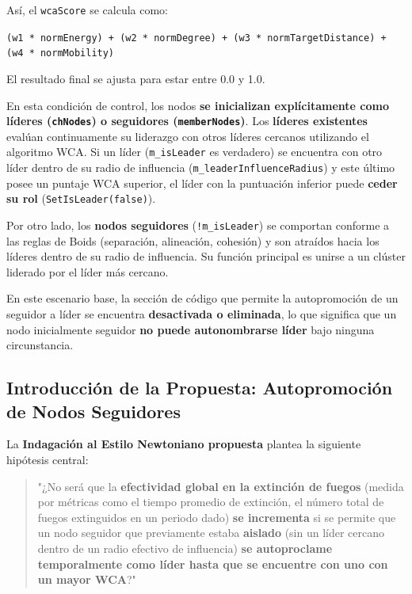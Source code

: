 \documentclass{article}
\begin{document}
Así, el \texttt{wcaScore} se calcula como:

\begin{center}
\texttt{(w1 * normEnergy) + (w2 * normDegree) + (w3 * normTargetDistance) + (w4 * normMobility)}
\end{center}

El resultado final se ajusta para estar entre 0.0 y 1.0.

En esta condición de control, los nodos \textbf{se inicializan explícitamente como líderes (\texttt{chNodes}) o seguidores (\texttt{memberNodes})}. Los \textbf{líderes existentes} evalúan continuamente su liderazgo con otros líderes cercanos utilizando el algoritmo WCA. Si un líder (\texttt{m\_isLeader} es verdadero) se encuentra con otro líder dentro de su radio de influencia (\texttt{m\_leaderInfluenceRadius}) y este último posee un puntaje WCA superior, el líder con la puntuación inferior puede \textbf{ceder su rol} (\texttt{SetIsLeader(false)}).

Por otro lado, los \textbf{nodos seguidores} (\texttt{!m\_isLeader}) se comportan conforme a las reglas de Boids (separación, alineación, cohesión) y son atraídos hacia los líderes dentro de su radio de influencia. Su función principal es unirse a un clúster liderado por el líder más cercano.

En este escenario base, la sección de código que permite la autopromoción de un seguidor a líder se encuentra \textbf{desactivada o eliminada}, lo que significa que un nodo inicialmente seguidor \textbf{no puede autonombrarse líder} bajo ninguna circunstancia.

\subsection*{Introducción de la Propuesta: Autopromoción de Nodos Seguidores}

La \textbf{Indagación al Estilo Newtoniano propuesta} plantea la siguiente hipótesis central:

\begin{quote}
"¿No será que la \textbf{efectividad global en la extinción de fuegos} (medida por métricas como el tiempo promedio de extinción, el número total de fuegos extinguidos en un periodo dado) \textbf{se incrementa} si se permite que un nodo seguidor que previamente estaba \textbf{aislado} (sin un líder cercano dentro de un radio efectivo de influencia) \textbf{se autoproclame temporalmente como líder hasta que se encuentre con uno con un mayor WCA}?"
\end{quote}
\end{document}
